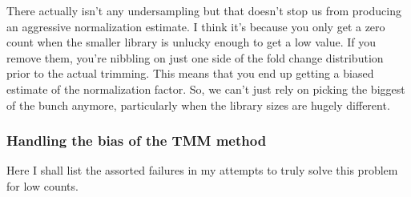 \documentclass[12pt]{report}
\begin{document}
There actually isn't any undersampling but that doesn't stop us from producing an aggressive normalization estimate. 
I think it's because you only get a zero count when the smaller library is unlucky enough to get a low value. 
If you remove them, you're nibbling on just one side of the fold change distribution prior to the actual trimming. 
This means that you end up  getting a biased estimate of the normalization factor.  
So, we can't just rely on picking the biggest of the bunch anymore, particularly when the library sizes are hugely different.

\subsubsection*{Handling the bias of the TMM method}
Here I shall list the assorted failures in my attempts to truly solve this problem for low counts.
\end{document}
